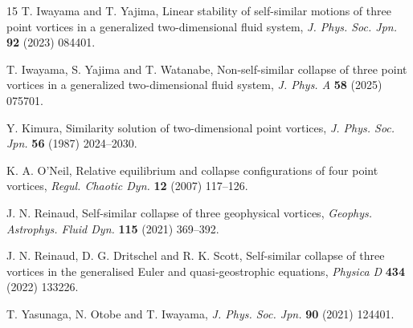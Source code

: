 \documentclass[11pt]{article}
\theoremstyle{definition}
\begin{document}
\begin{thebibliography}{15}
 T. Iwayama and T. Yajima, Linear stability of self-similar motions of three point vortices in a generalized two-dimensional fluid system, \emph{J. Phys. Soc. Jpn.} \textbf{92} (2023) 084401.

 T. Iwayama, S. Yajima and T. Watanabe, Non-self-similar collapse of three point vortices in a generalized two-dimensional fluid system, \emph{J. Phys. A} \textbf{58} (2025) 075701.

 Y. Kimura, Similarity solution of two-dimensional point vortices, \emph{J. Phys. Soc. Jpn.} \textbf{56} (1987) 2024--2030.

 K. A. O'Neil, Relative equilibrium and collapse configurations of four point vortices, \emph{Regul. Chaotic Dyn.} \textbf{12} (2007) 117--126.

 J. N. Reinaud, Self-similar collapse of three geophysical vortices, \emph{Geophys. Astrophys. Fluid Dyn.} \textbf{115} (2021) 369--392.

 J. N. Reinaud, D. G. Dritschel and R. K. Scott, Self-similar collapse of three vortices in the generalised Euler and quasi-geostrophic equations, \emph{Physica D} \textbf{434} (2022) 133226.

 T. Yasunaga, N. Otobe and T. Iwayama, \emph{J. Phys. Soc. Jpn.} \textbf{90} (2021) 124401.

\end{thebibliography}
\end{document}
